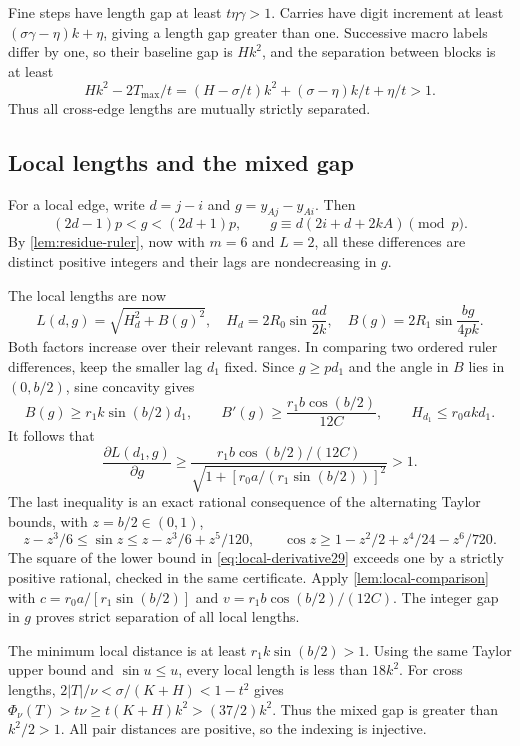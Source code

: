 \documentclass[11pt]{article}
\numberwithin{equation}{section}
\theoremstyle{definition}\newtheorem{definition}[theorem]{Definition}
\theoremstyle{remark}\newtheorem{remark}[theorem]{Remark}
\begin{document}
Fine steps have length gap at least $t\eta\gamma>1$. Carries have digit
increment at least $(\sigma\gamma-\eta)k+\eta$, giving a length gap
greater than one. Successive macro labels differ by one, so their
baseline gap is $Hk^2$, and the separation between blocks is at least
\[
 Hk^2-2T_{\max}/t
 =(H-\sigma/t)k^2+(\sigma-\eta)k/t+\eta/t>1.
\]
Thus all cross-edge lengths are mutually strictly separated.

\subsection{Local lengths and the mixed gap}

For a local edge, write $d=j-i$ and $g=y_{Aj}-y_{Ai}$. Then
\[
 (2d-1)p<g<(2d+1)p,\qquad g\equiv d(2i+d+2kA)\pmod p.
\]
By \cref{lem:residue-ruler}, now with $m=6$ and $L=2$, all these
differences are distinct positive integers and their lags are nondecreasing
in $g$.

The local lengths are now
\[
 L(d,g)=\sqrt{H_d^2+B(g)^2},\quad
 H_d=2R_0\sin\frac{ad}{2k},\quad B(g)=2R_1\sin\frac{bg}{4pk}.
\]
Both factors increase over their relevant ranges. In comparing two
ordered ruler differences, keep the smaller lag $d_1$ fixed. Since
$g\ge pd_1$ and the angle in $B$ lies in $(0,b/2)$, sine concavity gives
\[
 B(g)\ge r_1k\sin(b/2)d_1,\qquad
 B'(g)\ge\frac{r_1b\cos(b/2)}{12C},\qquad
 H_{d_1}\le r_0akd_1.
\]
It follows that
\begin{equation}\label{eq:local-derivative29}
 \frac{\partial L(d_1,g)}{\partial g}\ge
 \frac{r_1b\cos(b/2)/(12C)}
 {\sqrt{1+[r_0a/(r_1\sin(b/2))]^2}}>1.
\end{equation}
The last inequality is an exact rational consequence of the alternating
Taylor bounds, with $z=b/2\in(0,1)$,
\[
 z-z^3/6\le\sin z\le z-z^3/6+z^5/120,\qquad
 \cos z\ge1-z^2/2+z^4/24-z^6/720.
\]
The square of the lower bound in \eqref{eq:local-derivative29} exceeds
one by a strictly positive rational, checked in the same certificate.
Apply \cref{lem:local-comparison} with
$c=r_0a/[r_1\sin(b/2)]$ and $v=r_1b\cos(b/2)/(12C)$.
The integer gap in $g$ proves strict separation of all local lengths.

The minimum local distance is at least $r_1k\sin(b/2)>1$. Using the same
Taylor upper bound and $\sin u\le u$, every local length is less than
$18k^2$. For cross lengths, $2|T|/\nu<\sigma/(K+H)<1-t^2$ gives
$\Phi_\nu(T)>t\nu\ge t(K+H)k^2>(37/2)k^2$.
Thus the mixed gap is greater than $k^2/2>1$.
All pair distances are positive, so the indexing is injective.
\end{document}
